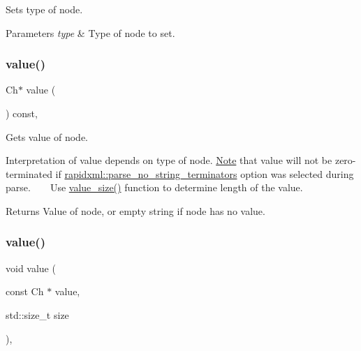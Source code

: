 Sets type of node. 


\begin{DoxyParams}{Parameters}
{\em type} & Type of node to set. \\
\hline
\end{DoxyParams}
\mbox{\label{classrapidxml_1_1xml__base_a558b1045e6751e4024309d41bf35c542}} 
\subsubsection{\texorpdfstring{value()}{value()}\hspace{0.1cm}{\footnotesize\ttfamily [1/3]}}
{\footnotesize\ttfamily Ch$\ast$ value (\begin{DoxyParamCaption}{ }\end{DoxyParamCaption}) const\hspace{0.3cm}{\ttfamily [inline]}, {\ttfamily [inherited]}}



Gets value of node. 

Interpretation of value depends on type of node. \mbox{\hyperlink{classNote}{Note}} that value will not be zero-\/terminated if \mbox{\hyperlink{namespacerapidxml_a9cae3801e70437cbc410c24bf6be691c}{rapidxml\+::parse\+\_\+no\+\_\+string\+\_\+terminators}} option was selected during parse. ~\newline
~\newline
 Use \mbox{\hyperlink{classrapidxml_1_1xml__base_aa6981b3244607ea4ae7634f74f25361b}{value\+\_\+size()}} function to determine length of the value. \begin{DoxyReturn}{Returns}
Value of node, or empty string if node has no value. 
\end{DoxyReturn}
\mbox{\label{classrapidxml_1_1xml__base_ad9640aa3f5374673cb72a5289b6c91eb}} 
\subsubsection{\texorpdfstring{value()}{value()}\hspace{0.1cm}{\footnotesize\ttfamily [2/3]}}
{\footnotesize\ttfamily void value (\begin{DoxyParamCaption}\item[{const Ch $\ast$}]{value,  }\item[{std\+::size\+\_\+t}]{size }\end{DoxyParamCaption})\hspace{0.3cm}{\ttfamily [inline]}, {\ttfamily [inherited]}}



